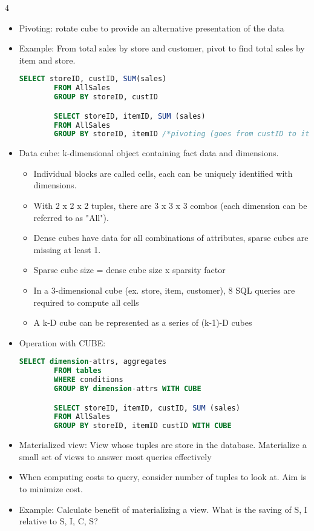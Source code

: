 \documentclass[8pt,landscape,a4paper, fleqn, dvipsnames]{extarticle}
\begin{document}
\begin{multicols*}{4}
\begin{itemize}
\begin{lstlisting}[language=SQL]
        SELECT category, city, age, SUM (sales)
        FROM AllSales F, Store S, Customer C, Item I
        WHERE F.storeID = S.storeID AND F.custID = C.custID AND F.itemID = I.itemID AND color = "red" AND state = "CA" /*dicing*/
        GROUP BY category, city, age
    \end{lstlisting}
    \item Pivoting: rotate cube to provide an alternative presentation of the data
    \item Example: From total sales by store and customer, pivot to find total sales by item and store.
    \begin{lstlisting}[language=SQL]
        SELECT storeID, custID, SUM(sales)
        FROM AllSales
        GROUP BY storeID, custID

        SELECT storeID, itemID, SUM (sales)
        FROM AllSales
        GROUP BY storeID, itemID /*pivoting (goes from custID to itemID)*/
    \end{lstlisting}
    \item Data cube: k-dimensional object containing fact data and dimensions. 
    \begin{itemize}
        \item Individual blocks are called cells, each can be uniquely identified with dimensions.
        \item With 2 x 2 x 2 tuples, there are 3 x 3 x 3 combos (each dimension can be referred to as "All").
        \item Dense cubes have data for all combinations of attributes, sparse cubes are missing at least 1. 
        \item Sparse cube size = dense cube size x sparsity factor
        \item In a 3-dimensional cube (ex. store, item, customer), 8 SQL queries are required to compute all cells
        \item A k-D cube can be represented as a series of (k-1)-D cubes
    \end{itemize}
    \item Operation with CUBE:
    \begin{lstlisting}[language=SQL]
        SELECT dimension-attrs, aggregates
        FROM tables
        WHERE conditions
        GROUP BY dimension-attrs WITH CUBE

        SELECT storeID, itemID, custID, SUM (sales)
        FROM AllSales
        GROUP BY storeID, itemID custID WITH CUBE
    \end{lstlisting}
    \item Materialized view: View whose tuples are store in the database. Materialize a small set of views to answer most queries effectively
    \item When computing costs to query, consider number of tuples to look at. Aim is to minimize cost.
    \item Example: Calculate benefit of materializing a view.
    What is the saving of {S, I} relative to {{S, I, C}, {S}}?


\end{itemize}
\end{multicols*}
\end{document}
